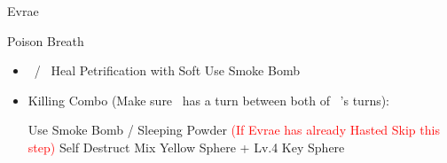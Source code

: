 \begin{battle}[32000]{Evrae}
	\vspace{\baselineskip}
	\begin{itemize}
		\enemyf Poison Breath
	\end{itemize}
	\vspace{\baselineskip}
	\begin{itemize}
		\switch{\auron}{\tidus}
		\tidusf Phoenix Down \rikku
		\tidusf Phoenix Down \kimahri
		\item \kimahri\ / \tidus\ Heal Petrification with Soft
		\rikkuf Use Smoke Bomb
		\item Killing Combo (Make sure \kimahri\ has a turn between both of \rikku\ 's turns):
		\begin{itemize}
			\rikkuf Use Smoke Bomb / Sleeping Powder \textcolor{Red}{(If Evrae has already Hasted Skip this step)}
			\kimahrif Self Destruct
			\rikkuf Mix Yellow Sphere + Lv.4 Key Sphere
		\end{itemize}
	\end{itemize}
\end{battle}
\newpage
\colstart
{}